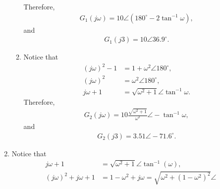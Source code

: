 \documentclass{article}
\begin{document}
\begin{enumerate}
\begin{enumerate}
    Therefore,
    \begin{align*}
     G_1(j\omega) = 10\angle (180^\circ -2\tan^{-1}\omega),
    \end{align*}
    and
    \begin{align*}
      G_1(j3) = 10\angle 36.9^\circ.
    \end{align*}
  \item Notice that
    \begin{align*}
      (j\omega)^2 -1 &= 1+\omega^2\angle 180^\circ,\\
      (j\omega)^2  &= \omega^2\angle 180^\circ,\\
      j\omega+1  &= \sqrt{\omega^2+1}\angle \tan^{-1}\omega.
    \end{align*}
    Therefore,
    \begin{align*}
      G_2(j\omega) = 10\frac{\sqrt{\omega^2+1}}{\omega^2}\angle -\tan^{-1}\omega,
    \end{align*}
    and
    \begin{align*}
      G_2(j3) = 3.51\angle -71.6^\circ.
    \end{align*}
  \end{enumerate}
\item Notice that
  \begin{align*}
    j\omega + 1 &= \sqrt{\omega^2+1}\angle \tan^{-1}(\omega),\\
    (j\omega)^2 + j\omega + 1 &= 1-\omega^2 + j\omega = \sqrt{\omega^2+(1-\omega^2)^2}\angle 
  \end{align*}



\end{enumerate}
\end{document}
